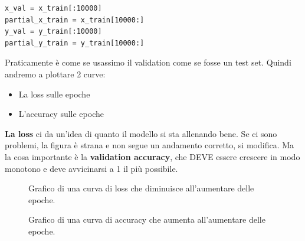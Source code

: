 \begin{lstlisting}
x_val = x_train[:10000]
partial_x_train = x_train[10000:]
y_val = y_train[:10000]
partial_y_train = y_train[10000:]

\end{lstlisting}

Praticamente è come se usassimo il validation come se fosse un test set. Quindi
andremo a plottare 2 curve:
\begin{itemize}
    \item La loss sulle epoche
    \item L'accuracy sulle epoche
\end{itemize}

\textbf{La loss} ci da un'idea di quanto il modello si sta allenando bene. Se ci sono problemi, la figura è strana e non segue un andamento corretto, si modifica.
Ma la cosa importante è la \textbf{validation accuracy}, che DEVE essere crescere in modo monotono e deve avvicinarsi a 1 il più possibile.

\begin{figure}[H]
    \centering
    \caption{Grafico di una curva di loss che diminuisce all'aumentare delle epoche.}
    \label{fig:loss_curve}
\end{figure}

\begin{figure}[H]
    \centering
    \caption{Grafico di una curva di accuracy che aumenta all'aumentare delle epoche.}
    \label{fig:accuracy_curve}
\end{figure}

